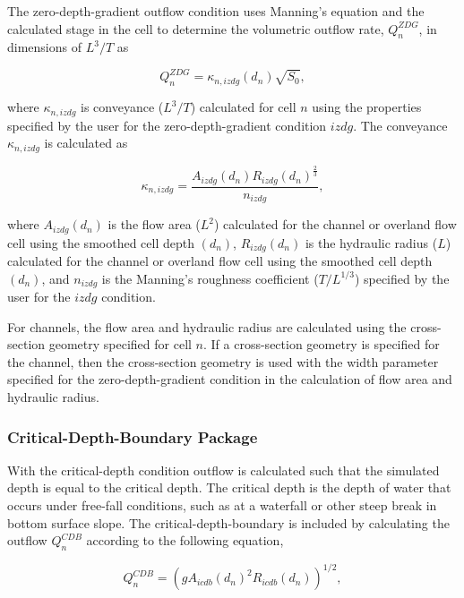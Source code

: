 \documentclass[fleqn]{article}
\begin{document}
The zero-depth-gradient outflow condition uses Manning's equation and the calculated stage in the cell to determine the volumetric outflow rate, $Q_{n}^{ZDG}$, in dimensions of $L^3/T$ as

\begin{equation}
  Q_{n}^{ZDG} = 
  \kappa_{n,izdg} \left ( d_n \right ) \sqrt{S_0},
\label{eqn:qzdg}
\end{equation}

\noindent where $\kappa_{n,izdg}$ is conveyance ($L^3/T$) calculated for cell $n$ using the properties specified by the user for the zero-depth-gradient condition $izdg$.  The conveyance $\kappa_{n,izdg}$ is calculated as

\begin{equation}
  \kappa_{n,izdg} = \frac{A_{izdg} (d_n) R_{izdg} (d_n)^{\frac{2}{3}}}{n_{izdg}},
\label{eqn:conveyancezdg}
\end{equation}

\noindent where $A_{izdg} (d_n)$ is the flow area ($L^2$) calculated for the channel or overland flow cell using the smoothed cell depth $(d_n)$, $R_{izdg} (d_n)$ is the hydraulic radius ($L$) calculated for the channel or overland flow cell using the smoothed cell depth $(d_n)$, and $n_{izdg}$ is the Manning's roughness coefficient ($T/L^{1/3}$) specified by the user for the $izdg$ condition.  

For channels, the flow area and hydraulic radius are calculated using the cross-section geometry specified for cell $n$.  If a cross-section geometry is specified for the channel, then the cross-section geometry is used with the width parameter specified for the zero-depth-gradient condition in the calculation of flow area and hydraulic radius.

\subsubsection{Critical-Depth-Boundary Package}

With the critical-depth condition outflow is calculated such that the simulated depth is equal to the critical depth.  The critical depth is the depth of water that occurs under free-fall conditions, such as at a waterfall or other steep break in bottom surface slope.  The critical-depth-boundary is included by calculating the outflow $Q_{n}^{CDB}$ according to the following equation,

\begin{equation}
  Q_{n}^{CDB} = 
  \left ( g A_{icdb} (d_n)^2 R_{icdb} (d_n) \right )^{1/2},
\label{eqn:qcdb}
\end{equation}
\end{document}
